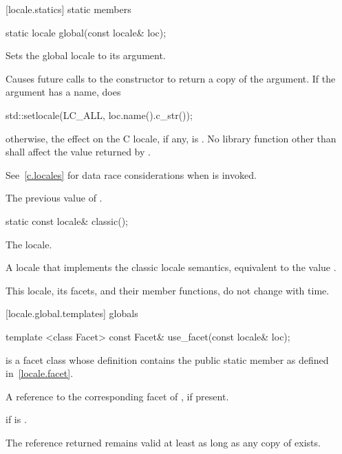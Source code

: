 [locale.statics]{ static members}

%
\begin{itemdecl}
static locale global(const locale& loc);
\end{itemdecl}

\begin{itemdescr}
\pnum
Sets the global locale to its argument.

\pnum
\effects
Causes future calls to the constructor
to return a copy of the argument.
If the argument has a name, does

\begin{codeblock}
std::setlocale(LC_ALL, loc.name().c_str());
\end{codeblock}

otherwise, the effect on the C locale, if any, is .
No library function other than
shall affect the value returned by
.
\begin{note} See~\ref{c.locales} for data race considerations when
 is invoked. \end{note}

\pnum
\returns
The previous value of
.
\end{itemdescr}

%
\begin{itemdecl}
static const locale& classic();
\end{itemdecl}

\begin{itemdescr}
\pnum
The  locale.

\pnum
\returns
A locale that implements the classic  locale semantics, equivalent
to the value .

\pnum
\remarks
This locale, its facets, and their member functions, do not change
with time.
\end{itemdescr}

[locale.global.templates]{ globals}

%
\begin{itemdecl}
template <class Facet> const Facet& use_facet(const locale& loc);
\end{itemdecl}

\begin{itemdescr}
\pnum
\requires
{}
is a facet class whose definition contains the public static member
as defined in~\ref{locale.facet}.

\pnum
\returns
A reference to the corresponding facet of , if present.

\pnum
\throws
{}
if
is
.

\pnum
\remarks
The reference returned remains valid at least as long as any copy of
 exists.
\end{itemdescr}

